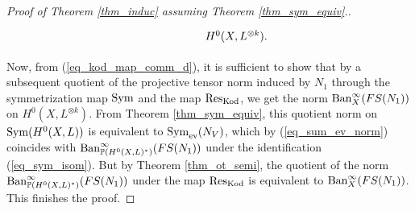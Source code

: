 \documentclass[12pt]{article}
\numberwithin{equation}{section}
\theoremstyle{theorem}
\theoremstyle{definition}
\theoremstyle{remark}
\newcommand{\res}{{\rm{Res}}}
\newcommand{\sym}{{\rm{Sym}}}
\begin{document}
\begin{proof}[Proof of Theorem \ref{thm_induc} assuming Theorem \ref{thm_sym_equiv}.]
\begin{sloppypar}
\begin{equation}
\begin{tikzcd}
 	 		&  & H^0(X, L^{\otimes k}).
    	\end{tikzcd}
		\end{equation}
		\end{sloppypar}
		\par 
		Now, from (\ref{eq_kod_map_comm_d}), it is sufficient to show that by a subsequent quotient of the projective tensor norm induced by $N_1$ through the symmetrization map $\sym$ and the map $\res_{{\rm{Kod}}}$, we get the norm ${\rm{Ban}}^{\infty}_{X}(FS(N_1))$ on $H^0(X, L^{\otimes k})$.
		From Theorem \ref{thm_sym_equiv}, this quotient norm on ${\rm{Sym}}(H^0(X, L))$ is equivalent to $\sym_{{\rm{ev}}}(N_V)$, which by (\ref{eq_sum_ev_norm}) coincides with ${\rm{Ban}}^{\infty}_{\mathbb{P}(H^0(X, L)^*)}(FS(N_1))$ under the identification (\ref{eq_sym_isom}).
		But by Theorem \ref{thm_ot_semi}, the quotient of the norm ${\rm{Ban}}^{\infty}_{\mathbb{P}(H^0(X, L)^*)}(FS(N_1))$ under the map $\res_{{\rm{Kod}}}$ is equivalent to ${\rm{Ban}}^{\infty}_{X}(FS(N_1))$. 
		This finishes the proof.
	\end{proof}
	
	
	
\end{document}
